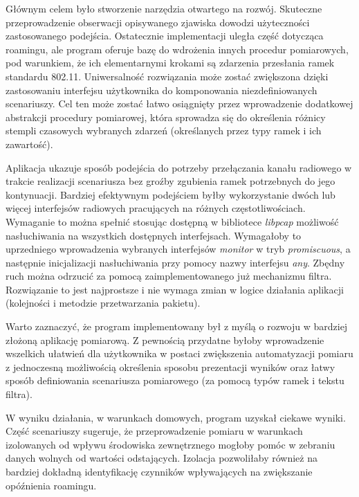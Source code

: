 
Głównym celem było stworzenie narzędzia otwartego na rozwój. Skuteczne przeprowadzenie obserwacji opisywanego zjawiska dowodzi użyteczności zastosowanego podejścia. Ostatecznie implementacji uległa część dotycząca roamingu, ale program oferuje bazę do wdrożenia innych procedur pomiarowych, pod warunkiem, że ich elementarnymi krokami są zdarzenia przesłania ramek standardu 802.11. Uniwersalność rozwiązania może zostać zwiększona dzięki zastosowaniu interfejsu użytkownika do komponowania niezdefiniowanych scenariuszy. Cel ten może zostać łatwo osiągnięty przez wprowadzenie dodatkowej abstrakcji procedury pomiarowej, która sprowadza się do określenia różnicy stempli czasowych wybranych zdarzeń (określanych przez typy ramek i ich zawartość).

Aplikacja ukazuje sposób podejścia do potrzeby przełączania kanału radiowego w trakcie realizacji scenariusza bez groźby zgubienia ramek potrzebnych do jego kontynuacji. Bardziej efektywnym podejściem byłby wykorzystanie dwóch lub więcej interfejsów radiowych pracujących na różnych częstotliwościach. Wymaganie to można spełnić stosując dostępną w bibliotece \emph{libpcap} możliwość nasłuchiwania na wszystkich dostępnych interfejsach. Wymagałoby to uprzedniego wprowadzenia wybranych interfejsów \emph{monitor} w tryb \emph{promiscuous}, a następnie inicjalizacji nasłuchiwania przy pomocy nazwy interfejsu \emph{any}. Zbędny ruch można odrzucić za pomocą zaimplementowanego już mechanizmu filtra. Rozwiązanie to jest najprostsze i nie wymaga zmian w logice działania aplikacji (kolejności i metodzie przetwarzania pakietu).

Warto zaznaczyć, że program implementowany był z myślą o rozwoju w bardziej złożoną aplikację pomiarową. Z pewnością przydatne byłoby wprowadzenie wszelkich ułatwień dla użytkownika w postaci zwiększenia automatyzacji pomiaru z jednoczesną możliwością określenia sposobu prezentacji wyników oraz łatwy sposób definiowania scenariusza pomiarowego (za pomocą typów ramek i tekstu filtra).

W wyniku działania, w warunkach domowych, program uzyskał ciekawe wyniki. Część scenariuszy sugeruje, że przeprowadzenie pomiaru w warunkach izolowanych od wpływu środowiska zewnętrznego mogłoby pomóc w zebraniu danych wolnych od wartości odstających. Izolacja pozwoliłaby również na bardziej dokładną identyfikację czynników wpływających na zwiększanie opóźnienia roamingu.



